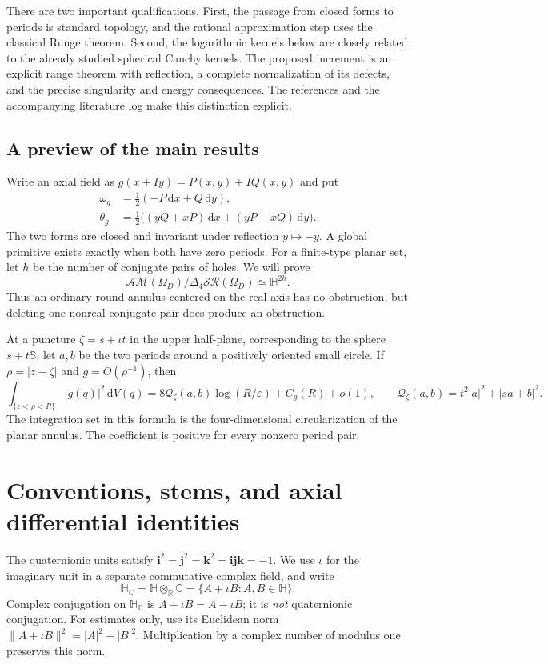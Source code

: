 \documentclass[11pt,a4paper]{article}
\numberwithin{equation}{section}
\theoremstyle{definition}
\theoremstyle{remark}
\newcommand{\R}{\mathbb R}
\newcommand{\C}{\mathbb C}
\newcommand{\HH}{\mathbb H}
\newcommand{\HC}{\mathbb H_{\C}}
\newcommand{\SSS}{\mathbb S}
\newcommand{\SR}{\mathcal{SR}}
\newcommand{\AM}{\mathcal{AM}}
\newcommand{\lap}{\Delta_4}
\newcommand{\dd}{\,\mathrm d}
\newcommand{\qf}{\mathcal Q}
\newcommand{\ii}{\mathbf i}
\newcommand{\jj}{\mathbf j}
\newcommand{\kk}{\mathbf k}
\begin{document}
There are two important qualifications. First, the passage from closed
forms to periods is standard topology, and the rational approximation step
uses the classical Runge theorem. Second, the logarithmic kernels below
are closely related to the already studied spherical Cauchy kernels.
The proposed increment is an explicit range theorem with reflection, a
complete normalization of its defects, and the precise singularity and
energy consequences. The references and the accompanying literature log
make this distinction explicit.

\subsection{A preview of the main results}
Write an axial field as $g(x+Iy)=P(x,y)+I Q(x,y)$ and put
\begin{align}
 \omega_g&=\frac12(-P\dd x+Q\dd y),\\
 \theta_g&=\frac12\big((yQ+xP)\dd x+(yP-xQ)\dd y\big).
 \label{eq:previewforms}
\end{align}
The two forms are closed and invariant under reflection $y\mapsto-y$.
A global primitive exists exactly when both have zero periods. For a
finite-type planar set, let $h$ be the number of conjugate pairs of holes.
We will prove
\begin{equation}
 \AM(\Omega_D)/\lap\SR(\Omega_D)\simeq\HH^{2h}.
 \label{eq:previewquotient}
\end{equation}
Thus an ordinary round annulus centered on the real axis has no obstruction,
but deleting one nonreal conjugate pair does produce an obstruction.

At a puncture $\zeta=s+\iota t$ in the upper half-plane, corresponding to
the sphere $s+t\SSS$, let $a,b$ be the two periods around a positively
oriented small circle. If $\rho=|z-\zeta|$ and $g=O(\rho^{-1})$, then
\begin{equation}
 \int_{\{\varepsilon<\rho<R\}}|g(q)|^2\dd V(q)
 =8\qf_\zeta(a,b)\log(R/\varepsilon)+C_g(R)+o(1),
 \qquad
 \qf_\zeta(a,b)=t^2|a|^2+|sa+b|^2.
 \label{eq:previewenergy}
\end{equation}
The integration set in this formula is the four-dimensional
circularization of the planar annulus. The coefficient is positive for
every nonzero period pair.

\section{Conventions, stems, and axial differential identities}
\label{sec:prelim}
The quaternionic units satisfy $\ii^2=\jj^2=\kk^2=\ii\jj\kk=-1$.
We use $\iota$ for the imaginary unit in a separate commutative complex
field, and write
\[
 \HC=\HH\otimes_\R\C=\{A+\iota B:A,B\in\HH\}.
\]
Complex conjugation on $\HC$ is
$\overline{A+\iota B}=A-\iota B$; it is \emph{not} quaternionic
conjugation. For estimates only, use its Euclidean norm
$\|A+\iota B\|^2=|A|^2+|B|^2$. Multiplication by a complex number of
modulus one preserves this norm.
\end{document}
